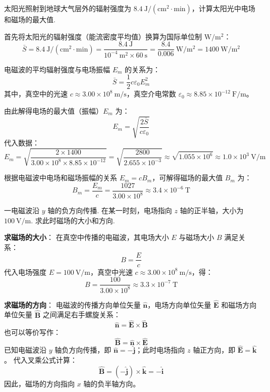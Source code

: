\begin{exercise}\label{ex:21.2}
太阳光照射到地球大气层外的辐射强度为 $8.4 \ \mathrm{J/(cm^2 \cdot min)}$，计算太阳光中电场和磁场的最大值.
\end{exercise}
\begin{solution}
首先将太阳光的辐射强度（能流密度平均值）换算为国际单位制 $\mathrm{W/m^2}$：
$$ \bar{S} = 8.4 \ \mathrm{J/(cm^2 \cdot min)} = \frac{8.4 \ \mathrm{J}}{10^{-4} \ \mathrm{m^2} \times 60 \ \mathrm{s}} = \frac{8.4}{0.006} \ \mathrm{W/m^2} = 1400 \ \mathrm{W/m^2} $$

电磁波的平均辐射强度与电场振幅 $E_m$ 的关系为：
$$ \bar{S} = \frac{1}{2} c \varepsilon_0 E_m^2 $$
其中，真空中的光速 $c \approx 3.00 \times 10^8 \ \mathrm{m/s}$，真空介电常数 $\varepsilon_0 \approx 8.85 \times 10^{-12} \ \mathrm{F/m}$。

由此解得电场的最大值（振幅）$E_m$ 为：
$$ E_m = \sqrt{\frac{2 \bar{S}}{c \varepsilon_0}} $$
代入数据：
$$ E_m = \sqrt{\frac{2 \times 1400}{3.00 \times 10^8 \times 8.85 \times 10^{-12}}} = \sqrt{\frac{2800}{2.655 \times 10^{-3}}} \approx \sqrt{1.055 \times 10^6} \approx 1.0 \times 10^3 \ \mathrm{V/m} $$

根据电磁波中电场和磁场振幅的关系 $E_m = c B_m$，可解得磁场的最大值 $B_m$ 为：
$$ B_m = \frac{E_m}{c} = \frac{1027}{3.00 \times 10^8} \approx 3.4 \times 10^{-6} \ \mathrm{T} $$
\end{solution}

\begin{exercise}\label{ex:21.3}
一电磁波沿 $y$ 轴的负方向传播. 在某一时刻，电场指向 $z$ 轴的正半轴，大小为 $100 \ \mathrm{V/m}$. 求此时磁场的大小和方向.
\end{exercise}
\begin{solution}
\textbf{求磁场的大小}：
在真空中传播的电磁波，其电场大小 $E$ 与磁场大小 $B$ 满足关系：
$$ B = \frac{E}{c} $$
代入电场强度 $E = 100 \ \mathrm{V/m}$，真空中光速 $c \approx 3.00 \times 10^8 \ \mathrm{m/s}$，得：
$$ B = \frac{100}{3.00 \times 10^8} \approx 3.3 \times 10^{-7} \ \mathrm{T} $$

\textbf{求磁场的方向}：
电磁波的传播方向单位矢量 $\hat{\boldsymbol{n}}$，电场方向单位矢量 $\hat{\boldsymbol{E}}$ 和磁场方向单位矢量 $\hat{\boldsymbol{B}}$ 之间满足右手螺旋关系：
$$ \hat{\boldsymbol{n}} = \hat{\boldsymbol{E}} \times \hat{\boldsymbol{B}} $$
也可以等价写作：
$$ \hat{\boldsymbol{B}} = \hat{\boldsymbol{n}} \times \hat{\boldsymbol{E}} $$
已知电磁波沿 $y$ 轴负方向传播，即 $\hat{\boldsymbol{n}} = -\hat{\boldsymbol{j}}$；此时电场指向 $z$ 轴正方向，即 $\hat{\boldsymbol{E}} = \hat{\boldsymbol{k}}$。
代入叉乘公式计算：
$$ \hat{\boldsymbol{B}} = (-\hat{\boldsymbol{j}}) \times \hat{\boldsymbol{k}} = -\hat{\boldsymbol{i}} $$
因此，磁场的方向指向 $x$ 轴的负半轴方向。
\end{solution}

